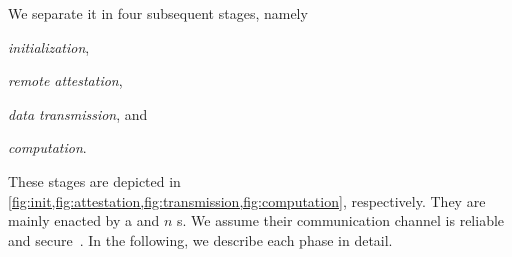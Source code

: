 We separate it in four subsequent stages, namely
\begin{inparaenum}
	\item \textit{initialization}, \item \textit{remote attestation}, \item \textit{data transmission}, and \item \textit{computation}.
\end{inparaenum}
These stages are depicted in \cref{fig:init,fig:attestation,fig:transmission,fig:computation}, respectively. They are mainly enacted by a  and $n$ s. We assume their communication channel is reliable~\citep{Cachin.etal/2011:ReliableSecureDistributedProgramming} and secure~\citep{KamilLowe/FAST2010:AbstractionsSecureChannels}. In the following, we describe each phase in detail.

